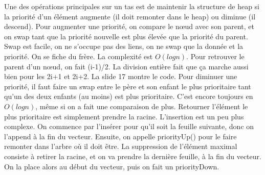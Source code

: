 \documentclass[10pt]{article}
\begin{document}
\newline \newline 
Une des opérations principales sur un tas est de maintenir la structure de heap si la priorité d'un élément augmente (il doit remonter dans le heap) ou diminue (il descend).  
\newline \newline 
Pour augmenter une priorité, on compare le nœud avec son parent, et on swap tant que la priorité nouvelle est plus élevée que la priorité du parent. Swap est facile, on ne s'occupe pas des liens, on ne swap que la donnée et la priorité. On se fiche du frère. La complexité est $O(log n)$. Pour retrouver le parent d'un nœud, on fait (i-1)/2. La division entière fait que ça marche aussi bien pour les 2i+1 et 2i+2. La slide 17 montre le code.  
\newline \newline 
Pour diminuer une priorité, il faut faire un swap entre le père et son enfant le plus prioritaire tant qu'un des deux enfants (au moins) est plus prioritaire. C'est encore toujours en $O(log n)$, même si on a fait une comparaison de plus. 
\newline \newline 
Retourner l'élément le plus prioritaire est simplement prendre la racine. L'insertion est un peu plus complexe. On commence par l'insérer pour qu'il soit la feuille suivante, donc on l'append à la fin du vecteur. Ensuite, on appelle priorityUp() pour le faire remonter dans l'arbre où il doit être.  
\newline \newline 
La suppression de l'élément maximal consiste à retirer la racine, et on va prendre la dernière feuille, à la fin du vecteur. On la place alors au début du vecteur, puis on fait un priorityDown. 
\end{document}
